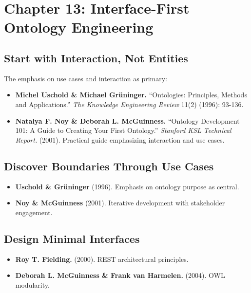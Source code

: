 \documentclass[
  openright]{book}
\begin{document}
\section{Chapter 13: Interface-First Ontology
Engineering}\label{chapter-13-interface-first-ontology-engineering}

\subsection{Start with Interaction, Not
Entities}\label{start-with-interaction-not-entities-1}

The emphasis on use cases and interaction as primary:

\begin{itemize}
\item
  \textbf{Michel Uschold \& Michael Grüninger.} ``Ontologies:
  Principles, Methods and Applications.'' \emph{The Knowledge
  Engineering Review} 11(2) (1996): 93-136.
\item
  \textbf{Natalya F. Noy \& Deborah L. McGuinness.} ``Ontology
  Development 101: A Guide to Creating Your First Ontology.''
  \emph{Stanford KSL Technical Report.} (2001). Practical guide
  emphasizing interaction and use cases.
\end{itemize}

\subsection{Discover Boundaries Through Use
Cases}\label{discover-boundaries-through-use-cases-1}

\begin{itemize}
\item
  \textbf{Uschold \& Grüninger} (1996). Emphasis on ontology purpose as
  central.
\item
  \textbf{Noy \& McGuinness} (2001). Iterative development with
  stakeholder engagement.
\end{itemize}

\subsection{Design Minimal
Interfaces}\label{design-minimal-interfaces-1}

\begin{itemize}
\item
  \textbf{Roy T. Fielding.} (2000). REST architectural principles.
\item
  \textbf{Deborah L. McGuinness \& Frank van Harmelen.} (2004). OWL
  modularity.
\end{itemize}
\end{document}

